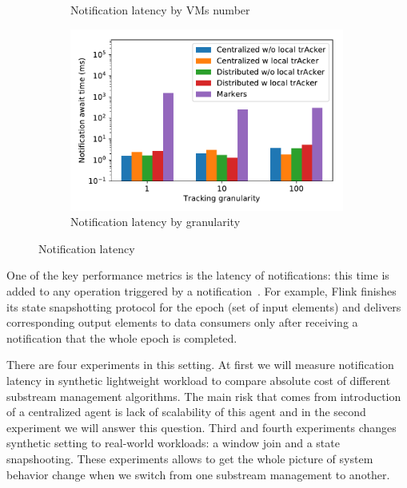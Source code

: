 \begin{figure}[t!]
\begin{subfigure}[b]{0.32\textwidth}
            \caption{Notification latency by VMs number}
            \label{notification_machines}
    \end{subfigure}
    \hspace{5mm}
    \begin{subfigure}[b]{0.32\textwidth}
            \includegraphics[width=0.99\textwidth]{pics/notification_await_time_by_tracking_frequency_bars.pdf}
            \caption{Notification latency by granularity}
            \label{notification_granularity}
    \end{subfigure}
    \caption{Notification latency}
    \label{notification_latency}
\end{figure}

One of the key performance metrics is the latency of notifications: this time is added to any operation triggered by a notification~\cite{Carbone:2017:SMA:3137765.3137777, we2018adbis}. For example, Flink finishes its state snapshotting protocol for the epoch (set of input elements) and delivers corresponding output elements to data consumers only after receiving a notification that the whole epoch is completed.

There are four experiments in this setting. At first we will measure notification latency in synthetic lightweight workload to compare absolute cost of different substream management algorithms. The main risk that comes from introduction of a centralized agent is lack of scalability of this agent and in the second experiment we will answer this question. Third and fourth experiments changes synthetic setting to real-world workloads: a window join and a state snapshooting. These experiments allows to get the whole picture of system behavior change when we switch from one substream management to another.

